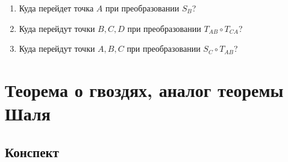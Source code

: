 \begin{enumerate}
\item Куда перейдет точка $A$ при преобразовании $S_B$?
\item Куда перейдут точки $B,C,D$ при преобразовании $T_{AB}\circ T_{CA}$?
\item Куда перейдут точки $A,B,C$ при преобразовании $S_C\circ T_{AB}$?
\end{enumerate}



\section{Теорема о гвоздях, аналог теоремы Шаля}

\subsection*{Конспект}
